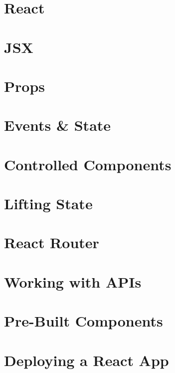 \documentclass[b5paper,openany]{book}
\begin{document}
\tp


\tableofcontents



\chapter{React}


\chapter{JSX}


\chapter{Props}


\chapter{Events \& State}


\chapter{Controlled Components}


\chapter{Lifting State}


\chapter{React Router}


\chapter{Working with APIs}


\chapter{Pre-Built Components}


\chapter{Deploying a React App}






\end{document}
